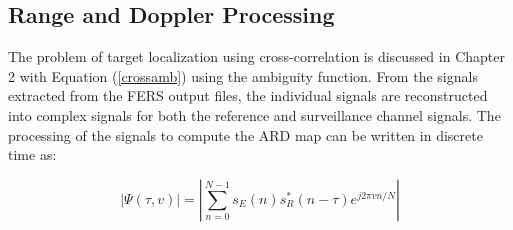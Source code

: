 \subsection{Range and Doppler Processing}
The problem of target localization using cross-correlation is discussed in Chapter 2 with Equation (\ref{crossamb})  using the ambiguity function. From the signals extracted from the \ac{FERS} output files, the individual signals are reconstructed into complex signals for both the reference and surveillance channel signals. The processing of the signals to compute the \ac{ARD} map  can be written in discrete time as: 

\begin{equation}
    \left| \Psi(\tau, v) \right| = \left| \sum_{n=0}^{N-1} s_E(n) s_R^*(n-\tau) e^{j 2\pi v n/N} \right|
\end{equation}

